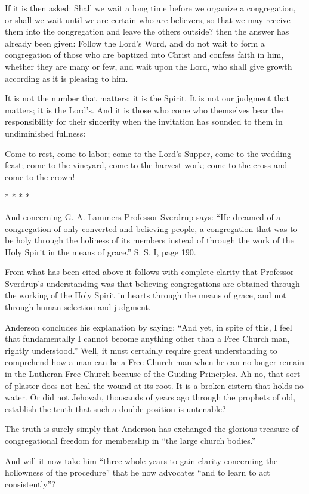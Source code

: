 If it is then asked: Shall we wait a long time before we organize a congregation, or shall we wait until we are certain who are believers, so that we may receive them into the congregation and leave the others outside? then the answer has already been given: Follow the Lord’s Word, and do not wait to form a congregation of those who are baptized into Christ and confess faith in him, whether they are many or few, and wait upon the Lord, who shall give growth according as it is pleasing to him.

It is not the number that matters; it is the Spirit. It is not our judgment that matters; it is the Lord’s. And it is those who come who themselves bear the responsibility for their sincerity when the invitation has sounded to them in undiminished fullness:

Come to rest, come to labor;
come to the Lord’s Supper, come to the wedding feast;
come to the vineyard, come to the harvest work;
come to the cross and come to the crown!

*  *  *  * 

And concerning G. A. Lammers Professor Sverdrup says: “He dreamed of a congregation of only converted and believing people, a congregation that was to be holy through the holiness of its members instead of through the work of the Holy Spirit in the means of grace.” S. S. I, page 190.

From what has been cited above it follows with complete clarity that Professor Sverdrup’s understanding was that believing congregations are obtained through the working of the Holy Spirit in hearts through the means of grace, and not through human selection and judgment.

Anderson concludes his explanation by saying: “And yet, in spite of this, I feel that fundamentally I cannot become anything other than a Free Church man, rightly understood.” Well, it must certainly require great understanding to comprehend how a man can be a Free Church man when he can no longer remain in the Lutheran Free Church because of the Guiding Principles. Ah no, that sort of plaster does not heal the wound at its root. It is a broken cistern that holds no water. Or did not Jehovah, thousands of years ago through the prophets of old, establish the truth that such a double position is untenable?

The truth is surely simply that Anderson has exchanged the glorious treasure of congregational freedom for membership in “the large church bodies.”

And will it now take him “three whole years to gain clarity concerning the hollowness of the procedure” that he now advocates “and to learn to act consistently”?

